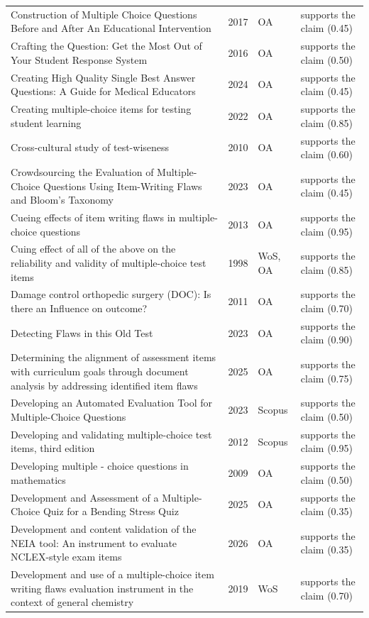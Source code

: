 \begin{longtable}{@{}%
  >{\raggedright\arraybackslash}p{}c%
  >{\raggedright\arraybackslash}p{}%
  >{\raggedright\arraybackslash}p{}@{}}
Construction of Multiple Choice Questions Before and After An Educational Intervention & 2017 & OA & supports the claim (0.45) \\
Crafting the Question: Get the Most Out of Your Student Response System & 2016 & OA & supports the claim (0.50) \\
Creating High Quality Single Best Answer Questions: A Guide for Medical Educators & 2024 & OA & supports the claim (0.45) \\
Creating multiple-choice items for testing student learning & 2022 & OA & supports the claim (0.85) \\
Cross-cultural study of test-wiseness & 2010 & OA & supports the claim (0.60) \\
Crowdsourcing the Evaluation of Multiple-Choice Questions Using Item-Writing Flaws and Bloom's Taxonomy & 2023 & OA & supports the claim (0.45) \\
Cueing effects of item writing flaws in multiple-choice questions & 2013 & OA & supports the claim (0.95) \\
Cuing effect of \textquotedbl{}all of the above\textquotedbl{} on the reliability and validity of multiple-choice test items & 1998 & WoS, OA & supports the claim (0.85) \\
Damage control orthopedic surgery (DOC): Is there an Influence on outcome? & 2011 & OA & supports the claim (0.70) \\
Detecting Flaws in this Old Test & 2023 & OA & supports the claim (0.90) \\
Determining the alignment of assessment items with curriculum goals through document analysis by addressing identified item flaws & 2025 & OA & supports the claim (0.75) \\
Developing an Automated Evaluation Tool for Multiple-Choice Questions & 2023 & Scopus & supports the claim (0.50) \\
Developing and validating multiple-choice test items, third edition & 2012 & Scopus & supports the claim (0.95) \\
Developing multiple - choice questions in mathematics & 2009 & OA & supports the claim (0.50) \\
Development and Assessment of a Multiple-Choice Quiz for a Bending Stress Quiz & 2025 & OA & supports the claim (0.35) \\
Development and content validation of the NEIA tool: An instrument to evaluate NCLEX-style exam items & 2026 & OA & supports the claim (0.35) \\
Development and use of a multiple-choice item writing flaws evaluation instrument in the context of general chemistry & 2019 & WoS & supports the claim (0.70) \\

\end{longtable}
